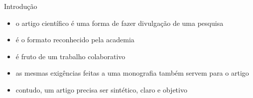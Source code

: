 \begin{frame}{Introdução}
    \begin{itemize}
        \item o artigo científico é uma forma de fazer divulgação de uma pesquisa
        \item é o formato reconhecido pela academia
        \item é fruto de um trabalho colaborativo
        \item as mesmas exigências feitas a uma monografia também servem para o artigo
        \item contudo, um artigo precisa ser sintético, claro e objetivo
    \end{itemize}
\end{frame}

